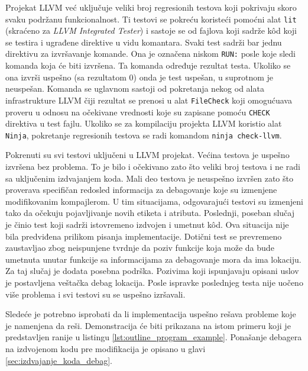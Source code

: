 \documentclass[12pt,oneside]{memoir}
\begin{document}
Projekat LLVM već uključuje veliki broj regresionih testova koji pokrivaju skoro svaku podržanu funkcionalnost.
Ti testovi se pokreću koristeći pomoćni alat \verb|lit| (skraćeno za {\em LLVM Integrated Tester}) i sastoje se od fajlova koji sadrže k\^od koji se testira i ugrađene direktive u vidu komantara.
Svaki test sadrži bar jednu direktivu za izvršavanje komande. Ona je označena niskom \verb|RUN:| posle koje sledi komanda koja će biti izvršena.
Ta komanda određuje rezultat testa. Ukoliko se ona izvrši uspešno (sa rezultatom 0) onda je test uspešan, u suprotnom je neuspešan.
Komanda se uglavnom sastoji od pokretanja nekog od alata infrastrukture LLVM čiji rezultat se prenosi u alat \verb|FileCheck| koji omogućuava proveru u odnosu na očekivane vrednosti koje su zapisane pomoću \verb|CHECK| direktiva u test fajlu. 
Ukoliko se za kompilaciju projekta LLVM koristio alat \verb|Ninja|, pokretanje regresionih testova se radi komandom \verb|ninja check-llvm|.

Pokrenuti su svi testovi uključeni u LLVM projekat. %
Većina testova je uspešno izvršena bez problema. To je bilo i očekivano zato što veliki broj testova i ne radi sa uključenim izdvajanjem koda.
Mali deo testova je neuspešno izvršen zato što proverava specifičan redosled informacija za debagovanje koje su izmenjene modifikovanim kompajlerom.
U tim situacijama, odgovarajući testovi su izmenjeni tako da očekuju pojavljivanje novih etiketa i atributa.
Poslednji, poseban slučaj je činio test koji sadrži istovremeno izdvojen i umetnut k\^od.
Ova situacija nije bila predviđena prilikom pisanja implementacije.
Dotični test se prevremeno zaustavljao zbog neispunjene tvrdnje da poziv funkcije koja može da bude umetnuta unutar funkcije sa informacijama za debagovanje mora da ima lokaciju.
Za taj slučaj je dodata posebna podrška.
Pozivima koji ispunjavaju opisani uslov je postavljena veštačka debag lokacija.
Posle ispravke poslednjeg testa nije uočeno više problema i svi testovi su se uspešno izršavali.

Sledeće je potrebno isprobati da li implementacija uspešno rešava probleme koje je namenjena da reši.
Demonstracija će biti prikazana na istom primeru koji je predstavljen ranije u listingu \ref{lst:outline_program_example}.
Ponašanje debagera na izdvojenom kodu pre modifikacija je opisano u glavi \ref{sec:izdvajanje_koda_debag}.
\end{document}
